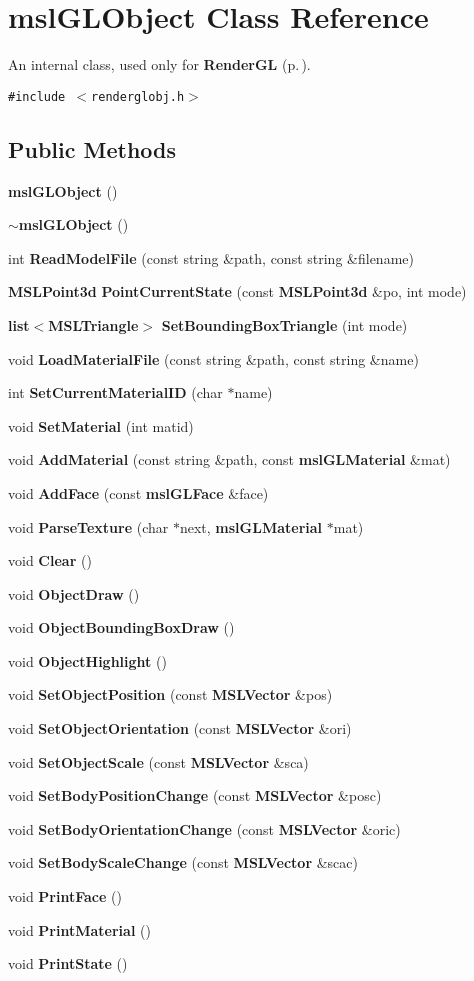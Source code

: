 \section{msl\-GLObject  Class Reference}
\label{classmslGLObject}
An internal class, used only for {\bf Render\-GL} {\rm (p.\,\pageref{classRenderGL})}. 


{\tt \#include $<$renderglobj.h$>$}

\subsection*{Public Methods}
\begin{CompactItemize}
\item 
{\bf msl\-GLObject} ()
\item 
{\bf $\sim$msl\-GLObject} ()
\item 
int {\bf Read\-Model\-File} (const string \&path, const string \&filename)
\item 
{\bf MSLPoint3d} {\bf Point\-Current\-State} (const {\bf MSLPoint3d} \&po, int mode)
\item 
{\bf list}$<${\bf MSLTriangle}$>$ {\bf Set\-Bounding\-Box\-Triangle} (int mode)
\item 
void {\bf Load\-Material\-File} (const string \&path, const string \&name)
\item 
int {\bf Set\-Current\-Material\-ID} (char $\ast$name)
\item 
void {\bf Set\-Material} (int matid)
\item 
void {\bf Add\-Material} (const string \&path, const {\bf msl\-GLMaterial} \&mat)
\item 
void {\bf Add\-Face} (const {\bf msl\-GLFace} \&face)
\item 
void {\bf Parse\-Texture} (char $\ast$next, {\bf msl\-GLMaterial} $\ast$mat)
\item 
void {\bf Clear} ()
\item 
void {\bf Object\-Draw} ()
\item 
void {\bf Object\-Bounding\-Box\-Draw} ()
\item 
void {\bf Object\-Highlight} ()
\item 
void {\bf Set\-Object\-Position} (const {\bf MSLVector} \&pos)
\item 
void {\bf Set\-Object\-Orientation} (const {\bf MSLVector} \&ori)
\item 
void {\bf Set\-Object\-Scale} (const {\bf MSLVector} \&sca)
\item 
void {\bf Set\-Body\-Position\-Change} (const {\bf MSLVector} \&posc)
\item 
void {\bf Set\-Body\-Orientation\-Change} (const {\bf MSLVector} \&oric)
\item 
void {\bf Set\-Body\-Scale\-Change} (const {\bf MSLVector} \&scac)
\item 
void {\bf Print\-Face} ()
\item 
void {\bf Print\-Material} ()
\item 
void {\bf Print\-State} ()
\end{CompactItemize}
